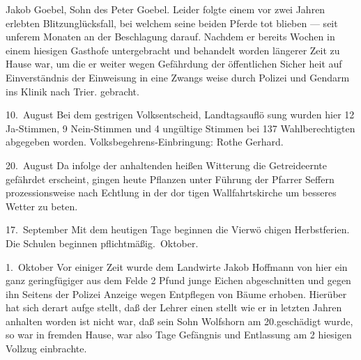

Jakob Goebel, Sohn des Peter Goebel. Leider folgte einem\ob
vor zwei Jahren erlebten Blitzunglücksfall, bei welchem\ob
seine beiden Pferde tot blieben — seit unferem\ob
Monaten an der Beschlagung darauf. Nachdem er bereits Wochen in einem hiesigen Gasthofe untergebracht und\ob
behandelt worden längerer Zeit zu Hause war, um\ob
die er weiter wegen Gefährdung der öffentlichen Sicher\ohb
heit auf Einverständnis der Einweisung in eine Zwangs\ohb
weise durch Polizei und Gendarm ins Klinik nach Trier.\ob
\unsicher gebracht.

10.\ August  Bei dem gestrigen Volksentscheid, Landtagsauflö\ohb
sung wurden hier 12 Ja-Stimmen, 9 Nein-Stimmen\ob
und 4 ungültige Stimmen bei 137 Wahlberechtigten\ob
abgegeben worden. Volksbegehrens-Einbringung: Rothe Gerhard.

20.\ August  Da infolge der anhaltenden heißen Witterung\ob
die Getreideernte gefährdet erscheint, gingen heute Pflanzen unter Führung der Pfarrer Seffern\ob
prozessionsweise nach Echtlung\unsicher{} in der dor\ohb
tigen Wallfahrtskirche um besseres Wetter zu beten.

17.\ September Mit dem heutigen Tage beginnen die Vierwö\ohb
chigen Herbstferien. Die Schulen beginnen pflichtmäßig.\ Oktober.

1.\ Oktober Vor einiger Zeit wurde dem Landwirte Jakob\ob
Hoffmann von hier ein ganz geringfügiger aus dem\ob
Felde 2 Pfund junge Eichen abgeschnitten und gegen\ob
ihn Seitens der Polizei Anzeige wegen\unsicher{} Entpflegen\ob
von Bäume erhoben\unsicher. Hierüber hat sich derart aufge\ohb
stellt, daß der Lehrer einen\unsicher{} stellt wie er in\ob
letzten Jahren anhalten worden ist nicht war, daß sein\ob
Sohn Wolfshorn am 20.\unsicher geschädigt\unsicher{} wurde,\ob
so war in fremden Hause\unsicher, war also\unsicher{} Tage\ob
\unsicher Gefängnis und Entlassung am 2\unsicher{} hiesigen\ob
Vollzug einbrachte.

\pend
{}
\pstart

\pend

